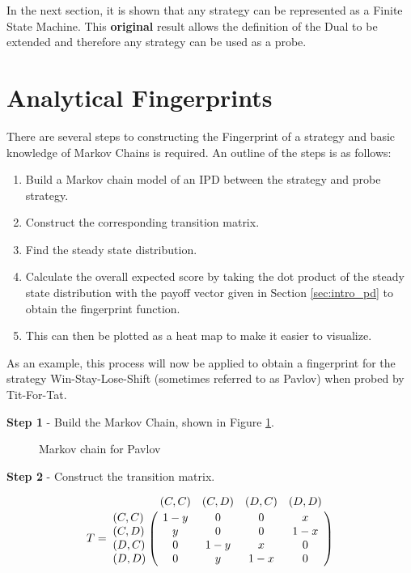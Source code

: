 In the next section, it is shown that any strategy can be represented as a Finite State Machine.
This \textbf{original} result allows the definition of the Dual to be extended and therefore any strategy can be used as a probe.



\section{Analytical Fingerprints}\label{sec:analytical-fingerprints}

There are several steps to constructing the Fingerprint of a strategy and basic knowledge of Markov Chains is required.
An outline of the steps is as follows:

\begin{enumerate}
    \item Build a Markov chain model of an IPD between the strategy and probe strategy.
    \item Construct the corresponding transition matrix.
    \item Find the steady state distribution.
    \item Calculate the overall expected score by taking the dot product of the steady state distribution with the payoff vector given in Section \ref{sec:intro_pd} to obtain the fingerprint function.
    \item This can then be plotted as a heat map to make it easier to visualize.
\end{enumerate}

As an example, this process will now be applied to obtain a fingerprint for the strategy Win-Stay-Lose-Shift (sometimes referred to as Pavlov) when probed by Tit-For-Tat.

\textbf{Step 1} - Build the Markov Chain, shown in Figure \ref{fig:PavlovMC}.

\begin{figure}[ht!]
\centering

\caption{Markov chain for Pavlov}
\label{fig:PavlovMC}
\end{figure}

\textbf{Step 2} - Construct the transition matrix.

\begin{equation}\label{eq:transition_matrix}
%
T = \bordermatrix{~      & (C, C) & (C, D) & (D, C) & (D, D) \cr
                  (C, C) & 1 - y  & 0      & 0      & x      \cr
                  (C, D) & y      & 0      & 0      & 1 - x  \cr
                  (D, C) & 0      & 1 - y  & x      & 0      \cr
                  (D, D) & 0      & y      & 1 - x  & 0}
%
\end{equation}

